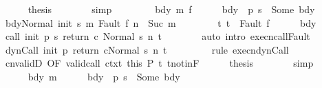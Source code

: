 \begin{isabellebody}
\ \ \ \ \isamarkupfalse%
\ {\isacharquery}thesis\isanewline
\ \ \ \ \ \ \isamarkupfalse%
\ simp\isanewline
\ \ \isamarkupfalse%
\isanewline
\ \ \ \ \isamarkupfalse%
\ bdy\ m\ f\isanewline
\ \ \ \ \isamarkupfalse%
\ bdy{\isacharcolon}\ {\isachardoublequoteopen}{\isasymGamma}\ {\isacharparenleft}p\ s{\isacharparenright}\ {\isacharequal}\ Some\ bdy{\isachardoublequoteclose}\isanewline
\ \ \ \ \isamarkupfalse%
\ {\isachardoublequoteopen}{\isasymGamma}{\isasymturnstile}{\isasymlangle}bdy{\isacharcomma}Normal\ {\isacharparenleft}init\ s{\isacharparenright}{\isasymrangle}\ {\isacharequal}m{\isasymRightarrow}\ Fault\ f{\isachardoublequoteclose}\ {\isachardoublequoteopen}n\ {\isacharequal}\ Suc\ m{\isachardoublequoteclose}\ \ \isanewline
\ \ \ \ \ \ t{\isacharcolon}\ {\isachardoublequoteopen}t\ {\isacharequal}\ Fault\ f{\isachardoublequoteclose}\isanewline
\ \ \ \ \isamarkupfalse%
\ bdy\ \isamarkupfalse%
\ {\isachardoublequoteopen}{\isasymGamma}{\isasymturnstile}{\isasymlangle}call\ init\ {\isacharparenleft}p\ s{\isacharparenright}\ return{\isacharprime}\ c\ {\isacharcomma}Normal\ s{\isasymrangle}\ {\isacharequal}n{\isasymRightarrow}\ t{\isachardoublequoteclose}\isanewline
\ \ \ \ \ \ \isamarkupfalse%
\ {\isacharparenleft}auto\ intro{\isacharcolon}\ execn{\isacharunderscore}callFault{\isacharparenright}\isanewline
\ \ \ \ \isamarkupfalse%
\ {\isachardoublequoteopen}{\isasymGamma}{\isasymturnstile}{\isasymlangle}dynCall\ init\ p\ return{\isacharprime}\ c{\isacharcomma}Normal\ s{\isasymrangle}\ {\isacharequal}n{\isasymRightarrow}\ t{\isachardoublequoteclose}\ \isanewline
\ \ \ \ \ \ \isamarkupfalse%
\ {\isacharparenleft}rule\ execn{\isacharunderscore}dynCall{\isacharparenright}\isanewline
\ \ \ \ \isamarkupfalse%
\ cnvalidD\ {\isacharbrackleft}OF\ valid{\isacharunderscore}call\ ctxt\ this\ P{\isacharbrackright}\ t\ t{\isacharunderscore}notin{\isacharunderscore}F\isanewline
\ \ \ \ \isamarkupfalse%
\ {\isacharquery}thesis\isanewline
\ \ \ \ \ \ \isamarkupfalse%
\ simp\isanewline
\ \ \isamarkupfalse%
\isanewline
\ \ \ \ \isamarkupfalse%
\ bdy\ m\isanewline
\ \ \ \ \isamarkupfalse%
\ bdy{\isacharcolon}\ {\isachardoublequoteopen}{\isasymGamma}\ {\isacharparenleft}p\ s{\isacharparenright}\ {\isacharequal}\ Some\ bdy{\isachardoublequoteclose}\isanewline
\ \ \ \ \isamarkupfalse%

\end{isabellebody}
